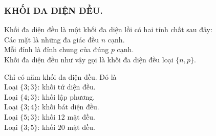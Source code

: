 \subsubsection{KHỐI ĐA DIỆN ĐỀU.}
\begin{dn}
	Khối đa diện đều là một khối đa diện lồi có hai tính chất sau đây:\\
	Các mặt là những đa giác đều $n$ cạnh.\\
	Mỗi đỉnh là đỉnh chung của đúng $p$ cạnh.\\
	Khối đa diện đều như vậy gọi là khối đa diện đều loại $\{n,p\}$.\\
\end{dn}
\begin{dl}
	Chỉ có năm khối đa diện đều. Đó là\\
	Loại $\{3; 3\}$: khối tứ diện đều.\\
	Loại $\{4; 3\}$: khối lập phương.\\
	Loại $\{3; 4\}$: khối bát diện đều.\\
	Loại $\{5; 3\}$: khối $12$ mặt đều.\\
	Loại $\{3; 5\}$: khối $20$ mặt đều.\\
\end{dl}
